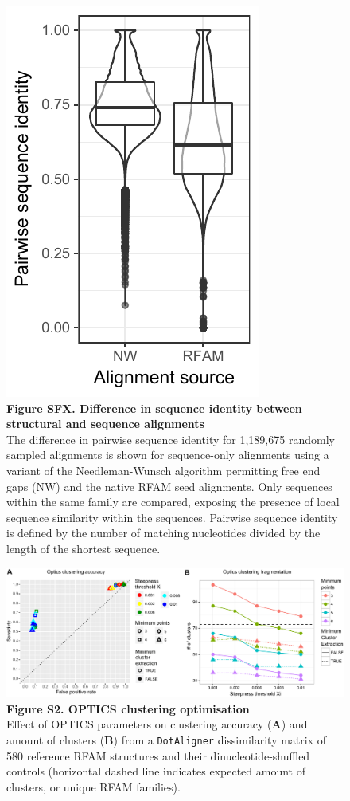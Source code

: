 \documentclass{bmcart}
\newcommand\dotaligner{\texttt{DotAligner}}
\begin{document}
\begin{figure}
 \includegraphics{SFX}
 \caption*{ \textbf{ Figure SFX. Difference in sequence identity between structural and sequence alignments}\\
The difference in pairwise sequence identity for 1,189,675 randomly sampled alignments is shown for 
sequence-only alignments using a variant of the Needleman-Wunsch algorithm
permitting free end gaps (NW) and the native RFAM seed alignments. 
Only sequences within the same family are compared, exposing the presence of  
local sequence similarity within the sequences. 
Pairwise sequence identity is defined by the number of matching nucleotides divided by the length of the 
shortest sequence. 
}
\end{figure}

\begin{figure}
 \includegraphics[width=\textwidth]{SF2}
 \caption*{ \textbf{ Figure S2. OPTICS clustering optimisation }\\
Effect of OPTICS parameters on clustering accuracy (\textbf{A}) and amount 
 of clusters (\textbf{B}) from a \dotaligner{} dissimilarity matrix of 580 reference RFAM 
 structures and their dinucleotide-shuffled controls (horizontal dashed line indicates 
 expected amount of clusters, or unique RFAM families). }
\end{figure}
\end{document}
